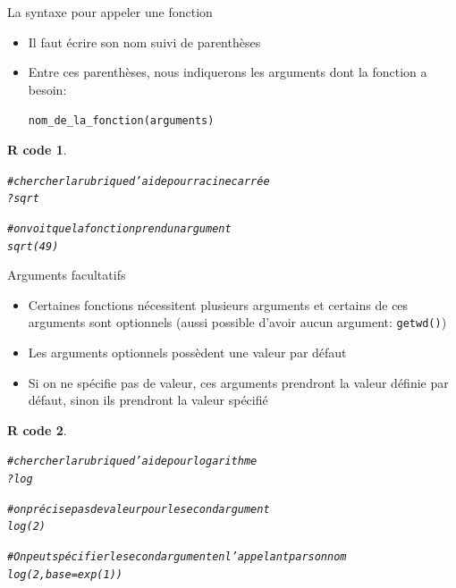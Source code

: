 \documentclass[11pt]{beamer}\usepackage[]{graphicx}\usepackage[]{color}
\makeatletter
\newcommand{\hlnum}[1]{\textcolor[rgb]{0.063,0.58,0.627}{#1}}%
\newcommand{\hlcom}[1]{\textcolor[rgb]{0.588,0.588,0.588}{#1}}%
\newcommand{\hlopt}[1]{\textcolor[rgb]{0.196,0.196,0.196}{#1}}%
\newcommand{\hlstd}[1]{\textcolor[rgb]{0.196,0.196,0.196}{#1}}%
\newcommand{\hlkwc}[1]{\textcolor[rgb]{0,0.631,0.314}{#1}}%
\newcommand{\hlkwd}[1]{\textcolor[rgb]{0.78,0.227,0.412}{#1}}%
\newenvironment{kframe}{%
 \def\at@end@of@kframe{}%
 \ifinner\ifhmode%
  \def\at@end@of@kframe{\end{minipage}}%
  \begin{minipage}{\columnwidth}%
 \fi\fi%
 \def\FrameCommand##1{\hskip\@totalleftmargin \hskip-\fboxsep
 \colorbox{shadecolor}{##1}\hskip-\fboxsep
     \hskip-\linewidth \hskip-\@totalleftmargin \hskip\columnwidth}%
 \MakeFramed {\advance\hsize-\width
   \@totalleftmargin\z@ \linewidth\hsize
   \@setminipage}}%
 {\par\unskip\endMakeFramed%
 \at@end@of@kframe}
\newenvironment{knitrout}{}{} %
\newtheorem{rcode}{R code}[section]
\newcommand{\code}[1]{\texttt{#1}}
\makeatother
\begin{document}
\begin{frame}[fragile]{La syntaxe pour appeler une fonction}
\begin{itemize}
 \setlength\itemsep{2em}
\item Il faut écrire son nom suivi de parenthèses
\pause \item Entre ces parenthèses, nous indiquerons les arguments dont la fonction a besoin:
\begin{center}
\code{nom\_de\_la\_fonction(arguments)}
\end{center}
\end{itemize}
\pause 
\begin{knitrout}
\color{fgcolor}\begin{kframe}
\begin{rcode}\label{unnamed-chunk-10}\begin{alltt}
\hlcom{# chercher la rubrique d'aide pour racine carrée}
\hlopt{?}\hlstd{sqrt}

\hlcom{# on voit que la fonction prend un argument}
\hlkwd{sqrt}\hlstd{(}\hlnum{49}\hlstd{)}
\end{alltt}
\end{rcode}\end{kframe}
\end{knitrout}

\end{frame}



\begin{frame}[fragile]{Arguments facultatifs}
\begin{itemize}
 \setlength\itemsep{0.5em}
\item Certaines fonctions nécessitent plusieurs arguments et certains de ces arguments sont optionnels (aussi possible d'avoir aucun argument: \code{getwd()}) 
\pause \item Les arguments optionnels possèdent une valeur par défaut
\pause \item Si on ne spécifie pas de valeur, ces arguments prendront la valeur définie par défaut, sinon ils prendront la valeur spécifié
\end{itemize}
\pause 

\begin{knitrout}\footnotesize
{}\color{fgcolor}\begin{kframe}
\begin{rcode}\label{unnamed-chunk-11}\begin{alltt}
\hlcom{# chercher la rubrique d'aide pour logarithme}
\hlopt{?}\hlstd{log}

\hlcom{# on précise pas de valeur pour le second argument}
\hlkwd{log}\hlstd{(}\hlnum{2}\hlstd{)}

\hlcom{# On peut spécifier le second argument en l'appelant par son nom}
\hlkwd{log}\hlstd{(}\hlnum{2}\hlstd{,} \hlkwc{base} \hlstd{=} \hlkwd{exp}\hlstd{(}\hlnum{1}\hlstd{))}
\end{alltt}
\end{rcode}\end{kframe}
\end{knitrout}

\end{frame}
\end{document}
